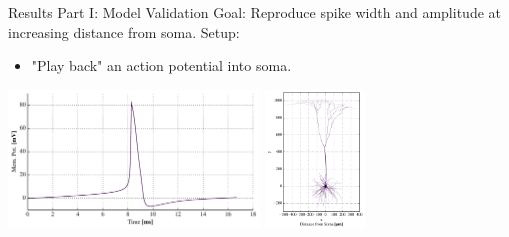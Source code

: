 \documentclass[aspectratio=169]{beamer}
\begin{document}
\begin{frame}{Results Part I: Model Validation}
    Goal: Reproduce spike width and amplitude at increasing distance from soma.
    Setup:
    \begin{itemize}
        \item "Play back" an action potential into soma. 
    \end{itemize}
    \begin{center}
        \includegraphics[width=0.5\textwidth]{images/cs_ap_scaled.pdf}
        \includegraphics[width=0.2\textwidth]{images/morph_xy_up.pdf}
    \end{center}
\end{frame}
\end{document}
